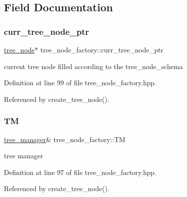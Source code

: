 \subsection{Field Documentation}
\mbox{\label{structtree__node__factory_aa05bb70210c04021d483f7935410e91c}} 
\subsubsection{\texorpdfstring{curr\+\_\+tree\+\_\+node\+\_\+ptr}{curr\_tree\_node\_ptr}}
{\footnotesize\ttfamily \hyperlink{classtree__node}{tree\+\_\+node}$\ast$ tree\+\_\+node\+\_\+factory\+::curr\+\_\+tree\+\_\+node\+\_\+ptr\hspace{0.3cm}{\ttfamily [private]}}



current tree node filled according to the tree\+\_\+node\+\_\+schema 



Definition at line 99 of file tree\+\_\+node\+\_\+factory.\+hpp.



Referenced by create\+\_\+tree\+\_\+node().

\mbox{\label{structtree__node__factory_ab189b3cf80040fd623a6dff783cbcc91}} 
\subsubsection{\texorpdfstring{TM}{TM}}
{\footnotesize\ttfamily \hyperlink{classtree__manager}{tree\+\_\+manager}\& tree\+\_\+node\+\_\+factory\+::\+TM\hspace{0.3cm}{\ttfamily [private]}}



tree manager 



Definition at line 97 of file tree\+\_\+node\+\_\+factory.\+hpp.



Referenced by create\+\_\+tree\+\_\+node().

